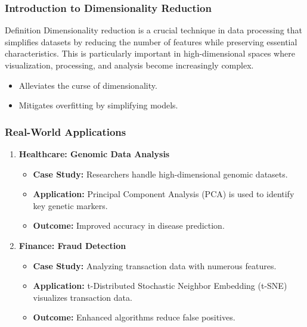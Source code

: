 \documentclass[aspectratio=169]{beamer}
\begin{document}
\begin{frame}[fragile]
    \titlepage
\end{frame}

\begin{frame}[fragile]
    \frametitle{Introduction to Dimensionality Reduction}
    \begin{block}{Definition}
        Dimensionality reduction is a crucial technique in data processing that simplifies datasets by reducing the number of features while preserving essential characteristics. This is particularly important in high-dimensional spaces where visualization, processing, and analysis become increasingly complex.
    \end{block}
    \begin{itemize}
        \item Alleviates the curse of dimensionality.
        \item Mitigates overfitting by simplifying models.
    \end{itemize}
\end{frame}

\begin{frame}[fragile]
    \frametitle{Real-World Applications}
    \begin{enumerate}
        \item \textbf{Healthcare: Genomic Data Analysis}
            \begin{itemize}
                \item \textbf{Case Study:} Researchers handle high-dimensional genomic datasets.
                \item \textbf{Application:} Principal Component Analysis (PCA) is used to identify key genetic markers.
                \item \textbf{Outcome:} Improved accuracy in disease prediction.
            \end{itemize}

        \item \textbf{Finance: Fraud Detection}
            \begin{itemize}
                \item \textbf{Case Study:} Analyzing transaction data with numerous features.
                \item \textbf{Application:} t-Distributed Stochastic Neighbor Embedding (t-SNE) visualizes transaction data.
                \item \textbf{Outcome:} Enhanced algorithms reduce false positives.
            \end{itemize}
    \end{enumerate}
\end{frame}
\end{document}
